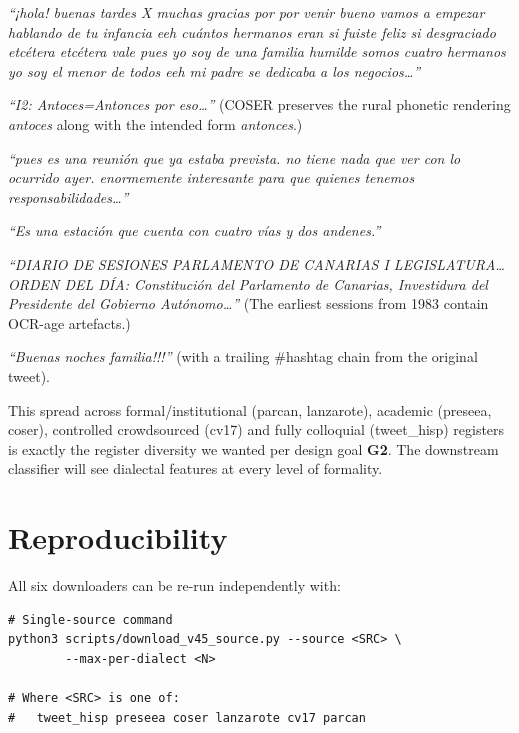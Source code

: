 \documentclass[11pt,a4paper]{article}
\begin{document}
\begin{description}[style=nextline,leftmargin=0pt]
  \item[preseea, ES\_CAN] \emph{``¡hola! buenas tardes X muchas gracias
    por por venir bueno vamos a empezar hablando de tu infancia eeh
    cuántos hermanos eran si fuiste feliz si desgraciado etcétera etcétera
    vale pues yo soy de una familia humilde somos cuatro hermanos yo soy
    el menor de todos eeh mi padre se dedicaba a los negocios\ldots''}
  \item[coser, ES\_CAN] \emph{``I2: Antoces=Antonces por eso\ldots''}
    (COSER preserves the rural phonetic rendering \emph{antoces} along
    with the intended form \emph{antonces}.)
  \item[lanzarote, ES\_CAN] \emph{``pues es una reunión que ya estaba
    prevista. no tiene nada que ver con lo ocurrido ayer. enormemente
    interesante para que quienes tenemos responsabilidades\ldots''}
  \item[cv17, ES\_CAN] \emph{``Es una estación que cuenta con cuatro vías
    y dos andenes.''}
  \item[parcan, ES\_CAN] \emph{``DIARIO DE SESIONES PARLAMENTO DE CANARIAS
    I LEGISLATURA\ldots ORDEN DEL DÍA: Constitución del Parlamento de
    Canarias, Investidura del Presidente del Gobierno Autónomo\ldots''}
    (The earliest sessions from 1983 contain OCR-age
    artefacts.)
  \item[tweet\_hisp, ES\_CAN] \emph{``Buenas noches familia!!!''} (with a
    trailing \#hashtag chain from the original tweet).
\end{description}

This spread across formal/institutional (parcan, lanzarote), academic
(preseea, coser), controlled crowdsourced (cv17) and fully colloquial
(tweet\_hisp) registers is exactly the register diversity we wanted per
design goal \textbf{G2}. The downstream classifier will see dialectal
features at every level of formality.

\section{Reproducibility}

All six downloaders can be re-run independently with:

\begin{lstlisting}[style=shellcode]
# Single-source command
python3 scripts/download_v45_source.py --source <SRC> \
        --max-per-dialect <N>

# Where <SRC> is one of:
#   tweet_hisp preseea coser lanzarote cv17 parcan
\end{lstlisting}
\end{document}
